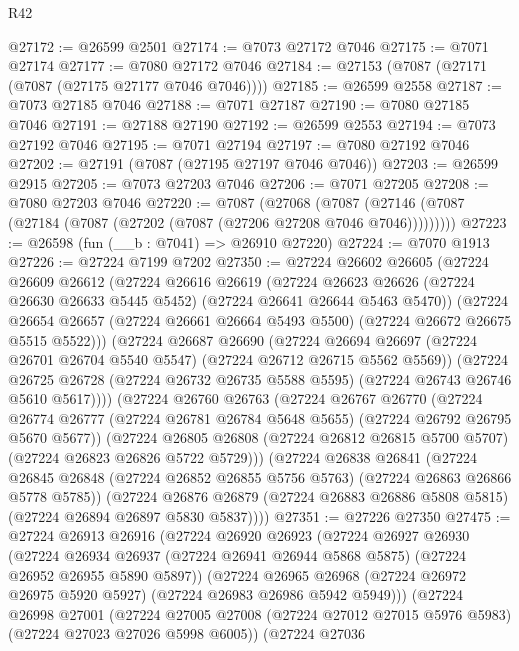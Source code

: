 \begin{lexlean}{R42}
\begin{coremodule}
{@27172 := @26599 @2501
@27174 := @7073 @27172 @7046
@27175 := @7071 @27174
@27177 := @7080 @27172 @7046
@27184 := @27153 (@7087 (@27171 (@7087 (@27175 @27177 @7046 @7046))))
@27185 := @26599 @2558
@27187 := @7073 @27185 @7046
@27188 := @7071 @27187
@27190 := @7080 @27185 @7046
@27191 := @27188 @27190
@27192 := @26599 @2553
@27194 := @7073 @27192 @7046
@27195 := @7071 @27194
@27197 := @7080 @27192 @7046
@27202 := @27191 (@7087 (@27195 @27197 @7046 @7046))
@27203 := @26599 @2915
@27205 := @7073 @27203 @7046
@27206 := @7071 @27205
@27208 := @7080 @27203 @7046
@27220 := @7087
    (@27068 (@7087 (@27146 (@7087 (@27184 (@7087 (@27202 (@7087 (@27206 @27208 @7046 @7046)))))))))
@27223 := @26598 (fun (__b : @7041) => @26910 @27220)
@27224 := @7070 @1913
@27226 := @27224 @7199 @7202
@27350 := @27224
    @26602
    @26605
    (@27224
      @26609
      @26612
      (@27224
        @26616
        @26619
        (@27224 @26623 @26626 (@27224 @26630 @26633 @5445 @5452) (@27224 @26641 @26644 @5463 @5470))
        (@27224
          @26654
          @26657
          (@27224 @26661 @26664 @5493 @5500)
          (@27224 @26672 @26675 @5515 @5522)))
      (@27224
        @26687
        @26690
        (@27224 @26694 @26697 (@27224 @26701 @26704 @5540 @5547) (@27224 @26712 @26715 @5562 @5569))
        (@27224
          @26725
          @26728
          (@27224 @26732 @26735 @5588 @5595)
          (@27224 @26743 @26746 @5610 @5617))))
    (@27224
      @26760
      @26763
      (@27224
        @26767
        @26770
        (@27224 @26774 @26777 (@27224 @26781 @26784 @5648 @5655) (@27224 @26792 @26795 @5670 @5677))
        (@27224
          @26805
          @26808
          (@27224 @26812 @26815 @5700 @5707)
          (@27224 @26823 @26826 @5722 @5729)))
      (@27224
        @26838
        @26841
        (@27224 @26845 @26848 (@27224 @26852 @26855 @5756 @5763) (@27224 @26863 @26866 @5778 @5785))
        (@27224
          @26876
          @26879
          (@27224 @26883 @26886 @5808 @5815)
          (@27224 @26894 @26897 @5830 @5837))))
@27351 := @27226 @27350
@27475 := @27224
    @26913
    @26916
    (@27224
      @26920
      @26923
      (@27224
        @26927
        @26930
        (@27224 @26934 @26937 (@27224 @26941 @26944 @5868 @5875) (@27224 @26952 @26955 @5890 @5897))
        (@27224
          @26965
          @26968
          (@27224 @26972 @26975 @5920 @5927)
          (@27224 @26983 @26986 @5942 @5949)))
      (@27224
        @26998
        @27001
        (@27224 @27005 @27008 (@27224 @27012 @27015 @5976 @5983) (@27224 @27023 @27026 @5998 @6005))
        (@27224
          @27036
}
\end{coremodule}
\end{lexlean}
